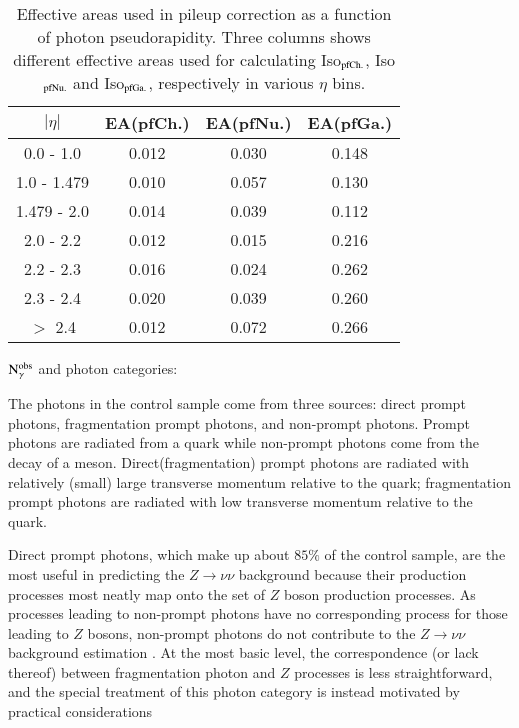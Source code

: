 \begin{table}[h]
\begin{center}
\caption{Effective areas used in pileup correction as a function of photon pseudorapidity. Three columns shows different effective areas used for calculating Iso$_{\rm pfCh.}$, Iso$_{\rm pfNu.}$ and Iso$_{\rm pfGa.}$, respectively in various $\eta$ bins. }
\begin{tabular}{|c|c|c|c|}
\hline 
$|\eta|$  & EA(pfCh.) & EA(pfNu.) & EA(pfGa.) \\ \hline 
0.0 - 1.0 & 0.012 & 0.030 & 0.148 \\ 
1.0 - 1.479 & 0.010 & 0.057 & 0.130 \\
1.479 - 2.0 & 0.014 & 0.039 & 0.112 \\
2.0 - 2.2 & 0.012 & 0.015 & 0.216 \\
2.2 - 2.3 & 0.016 & 0.024 & 0.262 \\
2.3 - 2.4 & 0.020 & 0.039 & 0.260 \\
$>$ 2.4 & 0.012 & 0.072 & 0.266 \\
\hline 
\end{tabular}
\label{tab:effarea}
\end{center}
\end{table}


{$\rm N_{\gamma}^{\rm obs}$ and photon categories: }


The photons in the control sample come from three sources: direct prompt photons, fragmentation 
prompt photons, and non-prompt photons.  Prompt photons are radiated from a quark while non-prompt photons come 
from the decay of a meson. Direct(fragmentation) prompt photons are radiated with relatively (small) large transverse momentum 
relative to the quark; fragmentation prompt photons are radiated with low transverse momentum relative 
to the quark.  

Direct prompt photons, which make up about $85\%$ of the control sample, are the most useful in predicting 
the $Z\to\nu\nu$ background because their production processes most neatly map onto the set of $Z$ boson 
production processes. As processes leading to non-prompt photons have no corresponding process for 
 those leading to $Z$ bosons, non-prompt photons do not contribute to the $Z\to\nu\nu$ background estimation 
.  At the most basic level, the correspondence (or lack thereof) between fragmentation photon 
 and $Z$ processes is less straightforward, and the special treatment of this photon category 
is instead motivated by practical considerations %

